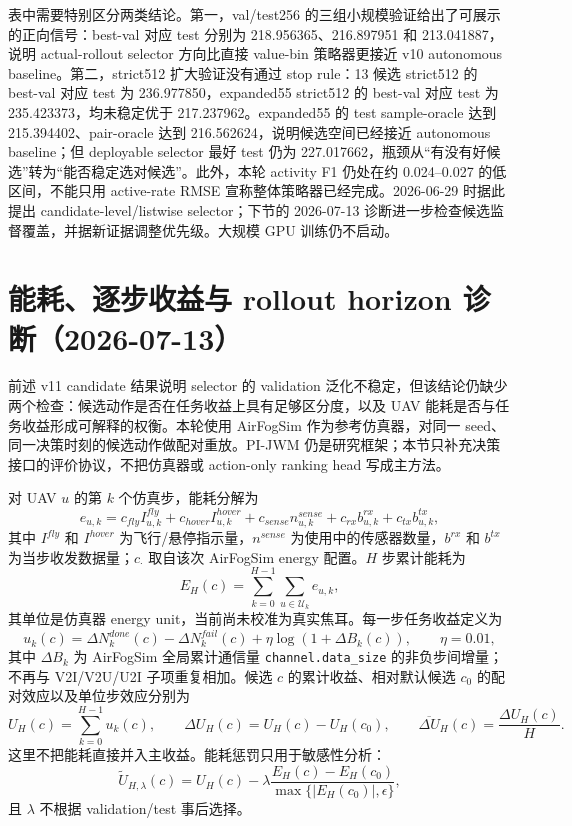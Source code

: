 \documentclass[UTF8,a4paper,11pt]{ctexart}
\newcommand{\code}[1]{\texttt{#1}}
\begin{document}
表中需要特别区分两类结论。第一，val/test256 的三组小规模验证给出了可展示的正向信号：best-val 对应 test 分别为 218.956365、216.897951 和 213.041887，说明 actual-rollout selector 方向比直接 value-bin 策略器更接近 v10 autonomous baseline。第二，strict512 扩大验证没有通过 stop rule：13 候选 strict512 的 best-val 对应 test 为 236.977850，expanded55 strict512 的 best-val 对应 test 为 235.423373，均未稳定优于 217.237962。expanded55 的 test sample-oracle 达到 215.394402、pair-oracle 达到 216.562624，说明候选空间已经接近 autonomous baseline；但 deployable selector 最好 test 仍为 227.017662，瓶颈从“有没有好候选”转为“能否稳定选对候选”。此外，本轮 activity F1 仍处在约 0.024--0.027 的低区间，不能只用 active-rate RMSE 宣称整体策略器已经完成。2026-06-29 时据此提出 candidate-level/listwise selector；下节的 2026-07-13 诊断进一步检查候选监督覆盖，并据新证据调整优先级。大规模 GPU 训练仍不启动。

\section{能耗、逐步收益与 rollout horizon 诊断（2026-07-13）}

前述 v11 candidate 结果说明 selector 的 validation 泛化不稳定，但该结论仍缺少两个检查：候选动作是否在任务收益上具有足够区分度，以及 UAV 能耗是否与任务收益形成可解释的权衡。本轮使用 AirFogSim 作为参考仿真器，对同一 seed、同一决策时刻的候选动作做配对重放。PI-JWM 仍是研究框架；本节只补充决策接口的评价协议，不把仿真器或 action-only ranking head 写成主方法。

对 UAV $u$ 的第 $k$ 个仿真步，能耗分解为
\[
e_{u,k}=c_{fly}I^{fly}_{u,k}+c_{hover}I^{hover}_{u,k}
+c_{sense}n^{sense}_{u,k}+c_{rx}b^{rx}_{u,k}+c_{tx}b^{tx}_{u,k},
\]
其中 $I^{fly}$ 和 $I^{hover}$ 为飞行/悬停指示量，$n^{sense}$ 为使用中的传感器数量，$b^{rx}$ 和 $b^{tx}$ 为当步收发数据量；$c_{\cdot}$ 取自该次 AirFogSim energy 配置。$H$ 步累计能耗为
\[
E_H(c)=\sum_{k=0}^{H-1}\sum_{u\in\mathcal U_k}e_{u,k},
\]
其单位是仿真器 energy unit，当前尚未校准为真实焦耳。每一步任务收益定义为
\[
u_k(c)=\Delta N^{done}_k(c)-\Delta N^{fail}_k(c)
+\eta\log\!\left(1+\Delta B_k(c)\right),\qquad \eta=0.01,
\]
其中 $\Delta B_k$ 为 AirFogSim 全局累计通信量 \code{channel.data\_size} 的非负步间增量；不再与 V2I/V2U/U2I 子项重复相加。候选 $c$ 的累计收益、相对默认候选 $c_0$ 的配对效应以及单位步效应分别为
\[
U_H(c)=\sum_{k=0}^{H-1}u_k(c),\qquad
\Delta U_H(c)=U_H(c)-U_H(c_0),\qquad
\overline{\Delta U}_H(c)=\frac{\Delta U_H(c)}{H}.
\]
这里不把能耗直接并入主收益。能耗惩罚只用于敏感性分析：
\[
\widetilde U_{H,\lambda}(c)=U_H(c)-\lambda
\frac{E_H(c)-E_H(c_0)}{\max\{|E_H(c_0)|,\epsilon\}},
\]
且 $\lambda$ 不根据 validation/test 事后选择。
\end{document}
